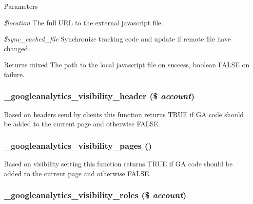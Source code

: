 \begin{DoxyParams}{Parameters}
\item[{\em \$location}]The full URL to the external javascript file. \item[{\em \$sync\_\-cached\_\-file}]Synchronize tracking code and update if remote file have changed. \end{DoxyParams}
\begin{DoxyReturn}{Returns}
mixed The path to the local javascript file on success, boolean FALSE on failure. 
\end{DoxyReturn}
\hypertarget{googleanalytics_8module_a2a9d546b674a43e5555343b2ac7ba07d}{
\subsubsection[{\_\-googleanalytics\_\-visibility\_\-header}]{\setlength{\rightskip}{0pt plus 5cm}\_\-googleanalytics\_\-visibility\_\-header (\$ {\em account})}}
\label{googleanalytics_8module_a2a9d546b674a43e5555343b2ac7ba07d}
Based on headers send by clients this function returns TRUE if GA code should be added to the current page and otherwise FALSE. \hypertarget{googleanalytics_8module_aabd650fcedc5f4053c9e5f3689d6f33f}{
\subsubsection[{\_\-googleanalytics\_\-visibility\_\-pages}]{\setlength{\rightskip}{0pt plus 5cm}\_\-googleanalytics\_\-visibility\_\-pages ()}}
\label{googleanalytics_8module_aabd650fcedc5f4053c9e5f3689d6f33f}
Based on visibility setting this function returns TRUE if GA code should be added to the current page and otherwise FALSE. \hypertarget{googleanalytics_8module_a2a9375ef0b0ef1b4cffc3fb8923d1c77}{
\subsubsection[{\_\-googleanalytics\_\-visibility\_\-roles}]{\setlength{\rightskip}{0pt plus 5cm}\_\-googleanalytics\_\-visibility\_\-roles (\$ {\em account})}}
